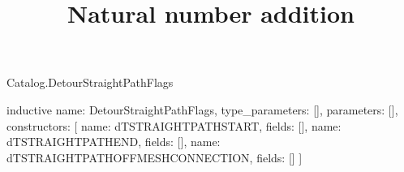 \begin{lexlean}{Catalog.DetourStraightPathFlags}
\title{Natural number addition}
\begin{semanticmodule}
inductive{
  name: DetourStraightPathFlags,
  type_parameters: [],
  parameters: [],
  constructors: [
    {name: dTSTRAIGHTPATHSTART, fields: []},
    {name: dTSTRAIGHTPATHEND, fields: []},
    {name: dTSTRAIGHTPATHOFFMESHCONNECTION, fields: []}
  ]
}
\end{semanticmodule}
\end{lexlean}
